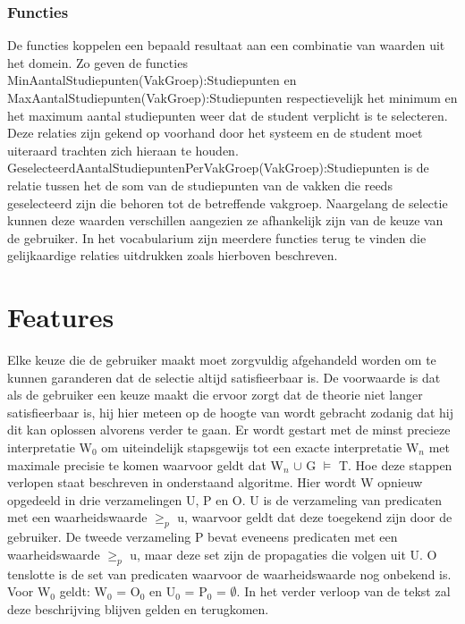 \subsubsection{Functies}
De functies koppelen een bepaald resultaat aan een combinatie van waarden uit het domein. Zo geven de functies MinAantalStudiepunten(VakGroep):Studiepunten en MaxAantalStudiepunten(VakGroep):Studiepunten respectievelijk het minimum en het maximum aantal studiepunten weer dat de student verplicht is te selecteren. Deze relaties zijn gekend op voorhand door het systeem en de student moet uiteraard trachten zich hieraan te houden. GeselecteerdAantalStudiepuntenPerVakGroep(VakGroep):Studiepunten is de relatie tussen het de som van de studiepunten van de vakken die reeds geselecteerd zijn die behoren tot de betreffende vakgroep. Naargelang de selectie kunnen deze waarden verschillen aangezien ze afhankelijk zijn van de keuze van de gebruiker. In het vocabularium zijn meerdere functies terug te vinden die gelijkaardige relaties uitdrukken zoals hierboven beschreven. 


\section{Features}
Elke keuze die de gebruiker maakt moet zorgvuldig afgehandeld worden om te kunnen garanderen dat de selectie altijd satisfieerbaar is. De voorwaarde is dat als de gebruiker een keuze maakt die ervoor zorgt dat de theorie niet langer satisfieerbaar is, hij hier meteen op de hoogte van wordt gebracht zodanig dat hij dit kan oplossen alvorens verder te gaan. Er wordt gestart met de minst precieze interpretatie W$_{0}$ om uiteindelijk stapsgewijs tot een exacte interpretatie W$_{n}$ met maximale precisie te komen waarvoor geldt dat W$_{n}$ $\cup$ G $\models$ T. Hoe deze stappen verlopen staat beschreven in onderstaand algoritme. Hier wordt W opnieuw opgedeeld in drie verzamelingen U, P en O. U is de verzameling van predicaten met een waarheidswaarde $\geq_{p}$ u, waarvoor geldt dat deze toegekend zijn door de gebruiker. De tweede verzameling P bevat eveneens predicaten met een waarheidswaarde $\geq_{p}$ u, maar deze set zijn de propagaties die volgen uit U. O tenslotte is de set van predicaten waarvoor de waarheidswaarde nog onbekend is. Voor W$_{0}$ geldt: W$_{0}$ = O$_{0}$ en U$_{0}$ = P$_{0}$ = $\emptyset$. In het verder verloop van de tekst zal deze beschrijving blijven gelden en terugkomen.


